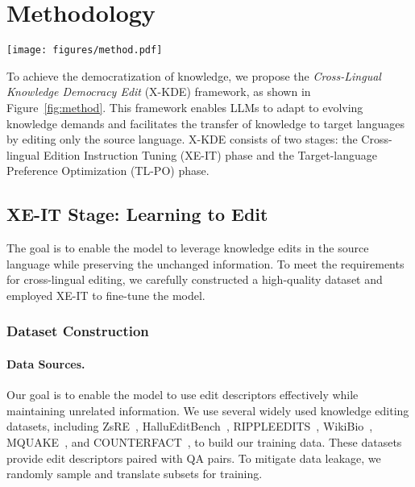 \section{Methodology}

\begin{figure*}[!t]
\centering
\texttt{[image: figures/method.pdf]}
\caption{\textbf{Illustration of \textit{Cross-Lingual Knowledge Democracy Edit} (X-KDE) framework}. In the XE-IT phase, we fine-tune the LLM on a carefully curated parallel dataset, enabling it to incorporate newly edited information from the source language when queried in the target language. In the TL-PO phase, multiple responses are generated, ranked based on similarity to the target language answer, and alignment optimization is applied to refine the output.}
\label{fig:method}
\end{figure*}

To achieve the democratization of knowledge, we propose the \textit{Cross-Lingual Knowledge Democracy Edit} (X-KDE) framework, as shown in Figure~\ref{fig:method}. This framework enables LLMs to adapt to evolving knowledge demands and facilitates the transfer of knowledge to target languages by editing only the source language. X-KDE consists of two stages: the Cross-lingual Edition Instruction Tuning (XE-IT) phase and the Target-language Preference Optimization (TL-PO) phase.

\subsection{XE-IT Stage: Learning to Edit}
\label{sec:XE-IT}

The goal is to enable the model to leverage knowledge edits in the source language while preserving the unchanged information. To meet the requirements for cross-lingual editing, we carefully constructed a high-quality dataset and employed XE-IT to fine-tune the model.

\subsubsection{Dataset Construction}

\paragraph{Data Sources.} Our goal is to enable the model to use edit descriptors effectively while maintaining unrelated information. We use several widely used knowledge editing datasets, including ZsRE~\cite{levy2017zero}, HalluEditBench~\cite{huang2024can}, RIPPLEEDITS~\cite{cohen2024evaluating}, WikiBio~\cite{hartvigsen2024aging}, MQUAKE~\cite{zhong2023mquake}, and COUNTERFACT~\cite{meng2022locating}, to build our training data. These datasets provide edit descriptors paired with QA pairs. To mitigate data leakage, we randomly sample and translate subsets for training.

